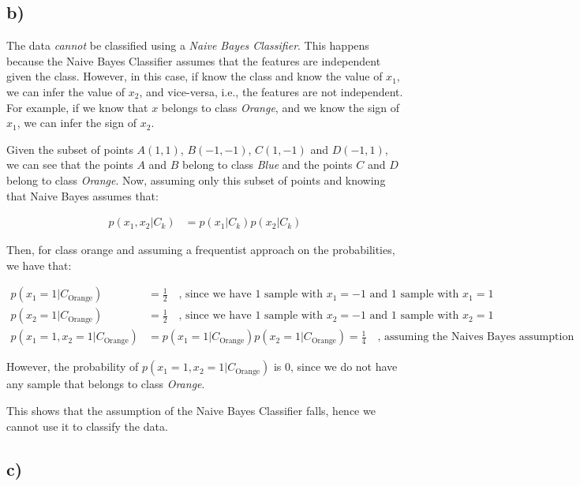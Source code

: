 \documentclass[12pt,a4paper,oneside]{paper}
\begin{document}
\subsection*{b)}

The data \textit{cannot} be classified using a \textit{Naive Bayes Classifier}. This happens because the Naive Bayes
Classifier assumes that the features are independent given the class. However, in this case, if know the class
and know the value of $x_1$, we can infer the value of $x_2$, and vice-versa, i.e., the features are not independent.
For example, if we know that $x$ belongs to class \textit{Orange}, and we know the sign of $x_1$, we can infer the sign of $x_2$.

Given the subset of points $A (1, 1)$, $B (-1, -1)$, $C (1, -1)$ and $D (-1, 1)$, we can see that the points $A$ and $B$ belong to class \textit{Blue} and the points $C$ and $D$ belong to class \textit{Orange}.
Now, assuming only this subset of points and knowing that Naive Bayes assumes that: 

\begin{align*}
    p(x_1, x_2 | C_k) &= p(x_1 | C_k) p(x_2 | C_k)
\end{align*}

Then, for class orange and assuming a frequentist approach on the probabilities, we have that: 

\begin{align*}
    p(x_1 = 1 | C_{\text{Orange}}) &= \frac{1}{2} \quad \text{, since we have 1 sample with $x_1 = -1$ and 1 sample with $x_1 = 1$} \\
    p(x_2 = 1 | C_{\text{Orange}}) &= \frac{1}{2} \quad \text{, since we have 1 sample with $x_2 = -1$ and 1 sample with $x_2 = 1$} \\
    p(x_1 = 1, x_2 = 1 | C_{\text{Orange}}) &= p(x_1 = 1 | C_{\text{Orange}}) p(x_2 = 1 | C_{\text{Orange}}) = \frac{1}{4} \quad \text{, assuming the Naives Bayes assumption}
\end{align*}

However, the probability of $p(x_1 = 1, x_2 = 1 | C_{\text{Orange}})$ is 0, since we do not have any sample that belongs to class \textit{Orange}. 

This shows that the assumption of the Naive Bayes Classifier falls, hence we cannot use it to classify the data.

\subsection*{c)}
\end{document}
